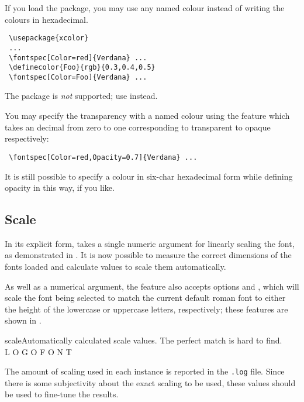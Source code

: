If you load the  package, you may use any named colour instead
of writing the colours in hexadecimal.
\begin{Verbatim}
 \usepackage{xcolor}
 ...
 \fontspec[Color=red]{Verdana} ...
 \definecolor{Foo}{rgb}{0.3,0.4,0.5}
 \fontspec[Color=Foo]{Verdana} ...
\end{Verbatim}
The  package is \emph{not} supported; use  instead.

You may specify the transparency with a named colour using the 
feature which takes an decimal from zero to one corresponding to
transparent to opaque respectively:
\begin{Verbatim}
 \fontspec[Color=red,Opacity=0.7]{Verdana} ...
\end{Verbatim}
It is still possible to specify a colour in six-char hexadecimal form
while defining opacity in this way, if you like.

\subsection{Scale}


In its explicit form,  takes a single
numeric argument for linearly scaling the font, as demonstrated
in .
It is now possible to
measure the correct dimensions of the fonts loaded and
calculate values to scale them automatically.

As well as a numerical argument, the  feature
also accepts options 
and , which will scale the font being selected to match
the current default roman font to either the height of the lowercase or
uppercase letters, respectively; these features are shown in .

\begin{Xexample}{scale}{Automatically calculated scale values.}
  \setmainfont{Georgia}
  \newfontfamily{}
   The perfect match {\lc is hard to find.}\\
  \newfontfamily{}
   L O G O \uc F O N T
\end{Xexample}

The amount of scaling used in each instance is reported in the \texttt{.log} file.
Since there is some subjectivity about the exact scaling to be used, these values
should be used to fine-tune the results.

